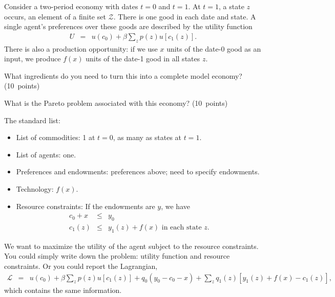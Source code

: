 \documentclass[11pt]{exam}
\begin{document}
\begin{questions}
Consider a two-period economy with dates $t=0$ and $t=1$.
At $t=1$, a state $z$ occurs, an element of a finite set $\mathcal{Z}$.
There is one good in each date and state.
A single agent's preferences over these goods are described
by the utility function
\begin{eqnarray*}
    U &=& u(c_0) + \beta \sum_z p(z) u[c_1(z)] .
\end{eqnarray*}
There is also a production opportunity:  if we use $x$ units of the date-0 good as an input,
we produce $f(x)$ units of the date-1 good in all states $z$.
%
\begin{parts}
\item What ingredients do you need to turn this into a complete model economy?
(10~points)
\item What is the Pareto problem associated with this economy?
(10~points)
\end{parts}

\begin{solution}
\begin{parts}
\item The standard list:
\begin{itemize}
\item List of commodities:  1 at $t=0$, as many as states at $t=1$.
\item List of agents:  one.
\item Preferences and endowments:  preferences above; need to specify endowments.
\item Technology:  $f(x)$.
\item Resource constraints:  If the endowments are $y$, we have
\begin{eqnarray*}
    c_0 + x &\leq& y_0 \\
    c_1(z)  &\leq& y_1(z) + f(x) \mbox{ in each state } z.
\end{eqnarray*}
\end{itemize}

\item We want to maximize the utility of the agent subject to the resource constraints.
You could simply write down the problem:  utility function and resource constraints.
Or you could report the Lagrangian,
{\small
\begin{eqnarray*}
    \mathcal{L} &=& u(c_0) + \beta \sum_z p(z) u[c_1(z)]
        + q_0 (y_0 - c_0 - x) + \sum_z q_1(z)
        [y_1(z) + f(x) - c_1(z) ] ,
\end{eqnarray*}
}
which contains the same information.


\end{parts}
\end{solution}
\end{questions}
\end{document}
